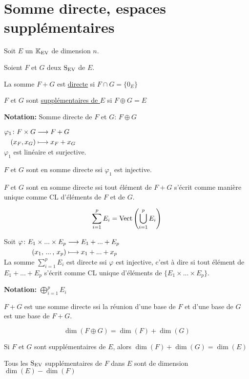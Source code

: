 \documentclass[12pt,twoside,a4paper]{article}
\begin{document}
	\section{Somme directe, espaces supplémentaires}
		\begin{flushleft}
			Soit $E$ un $\mathbb{K}_\mathrm{EV}$ de dimension $n$.
		\end{flushleft}
		\begin{defi}
			Soient $F$ et $G$ deux $\mathrm{S}_\mathrm{EV}$ de $E$.
			\begin{liste}
				\item La somme $F+G$ est \underline{directe} si $F\cap G=\{0_E\}$
				\item $F$ et $G$ sont \underline{supplémentaires de $E$} si $F\oplus G=E$
			\end{liste}
		\end{defi}
		\begin{flushleft}
			\textbf{Notation:} Somme directe de $F$ et $G$: $F\oplus G$
		\end{flushleft}
		\begin{prop}
			$\begin{aligned}[t]\varphi_1\colon F\times G&\longrightarrow F+G \\(x_F,x_G)&\longmapsto x_F+x_G\end{aligned}$\\
			$\varphi_1$ est linéaire et surjective.\\
			\begin{liste}
				\item $F$ et $G$ sont en somme directe ssi $\varphi_1$ est injective.
				\item $F$ et $G$ sont en somme directe ssi tout élément de $F+G$ s'écrit comme manière unique comme CL d'éléments de $F$ et de $G$.
			\end{liste}
		\end{prop}
		\begin{defi}
			$$\sum\limits_{i=1}^pE_i=\mathrm{Vect}\left( \bigcup\limits_{i=1}^pE_i\right) $$
		\end{defi}
		\begin{defi}
			Soit $\begin{aligned}[t]\varphi\colon E_1\times...\times E_p&\longrightarrow E_1+...+E_p \\(x_1,\,...\,,\,x_p)&\longmapsto x_1+...+x_p\end{aligned}$\\
			La somme $\sum\limits_{i=1}^pE_i$ est directe ssi $\varphi$ est injective, c'est \`a dire si tout élément de $E_1+...+E_p$ s'écrit comme CL unique d'éléments de $\{E_1\times...\times E_p\}$.
		\end{defi}
		\begin{flushleft}
			\textbf{Notation:} $\bigoplus\limits_{i=1}^pE_i$
		\end{flushleft}
		\begin{prop}
			$F+G$ est une somme directe ssi la réunion d'une base de $F$ et d'une base de $G$ est une base de $F+G$.
		\end{prop}
		\begin{coro}
			$$\dim(F\oplus G)=\dim(F)+\dim(G)$$
		\end{coro}
		\begin{coro}
			\begin{liste}
				\item Si $F$ et $G$ sont supplémentaires de $E$, alors $\dim(F)+\dim(G)=\dim(E)$
				\item Tous les $\mathrm{S}_\mathrm{EV}$ supplémentaires de $F$ dans $E$ sont de dimension $\dim(E)-\dim(F)$
			\end{liste}
			\end{coro}
\end{document}
